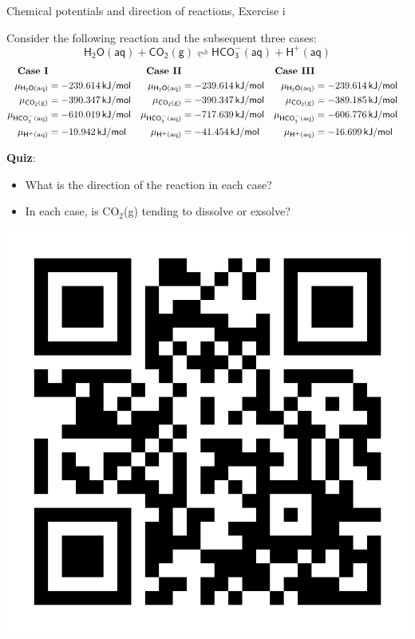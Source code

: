 \begin{frame}{Chemical potentials and direction of reactions, Exercise \; i}

Consider the following reaction and the subsequent
three cases:{
\[
\mathsf{H_{2}O(aq)+CO_{2}(g)\rightleftharpoons HCO_{3}^{-}(aq)+H^{+}(aq)}
\]
}\vspace{-4ex}
{\small{}
\begin{align*}
\text{\textbf{Case I}} &  & \textbf{Case II} &  & \textbf{Case III}\\
\mu_{\mathsf{H_{2}O\text{(aq)}}} & = -239.614\,{\mathsf{kJ/mol}} & 
\mu_{\mathsf{H_{2}O\text{(aq)}}} & = -239.614\,{\mathsf{kJ/mol}} & 
\mu_{\mathsf{H_{2}O\text{(aq)}}} & = -239.614\,{\mathsf{kJ/mol}}\\
\mu_{\mathsf{CO_{2}\text{(g)}}} & = -390.347\,{\mathsf{kJ/mol}} & 
\mu_{\mathsf{CO_{2}\text{(g)}}} & = -390.347\,{\mathsf{kJ/mol}} & 
\mu_{\mathsf{CO_{2}\text{(g)}}} & = -389.185\,{\mathsf{kJ/mol}}\\
\mu_{\mathsf{HCO_{3}^{-}\text{(aq)}}} & = -610.019\,{\mathsf{kJ/mol}} & 
\mu_{\mathsf{HCO_{3}^{-}\text{(aq)}}} & = -717.639\,{\mathsf{kJ/mol}} & 
\mu_{\mathsf{HCO_{3}^{-}\text{(aq)}}} & = -606.776\,{\mathsf{kJ/mol}}\\
\mu_{\mathsf{H^{+}\text{(aq)}}} & = -19.942\,{\mathsf{kJ/mol}} & 
\mu_{\mathsf{H^{+}\text{(aq)}}} & = -41.454\,{\mathsf{kJ/mol}} & 
\mu_{\mathsf{H^{+}\text{(aq)}}} & = -16.699\,{\mathsf{kJ/mol}}
\end{align*}
}{\small\par}
\pause
\alert{\textbf{Quiz}}:
\begin{itemize}
\item What is the direction of the reaction in each case?
\item In each case, is CO$_{2}$(g) tending to dissolve or exsolve? 
\end{itemize}
\vskip -45pt
\includegraphics[height=0.16\columnwidth,right]{figures/chemical-equilibrium/poll-linear-independence.png}
\end{frame}
%
